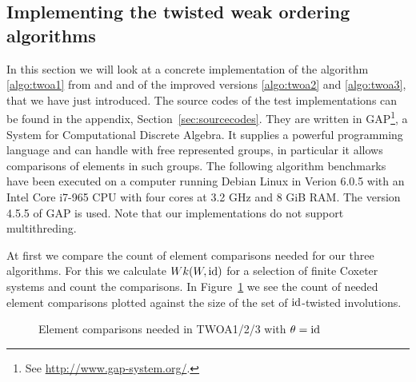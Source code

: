 \subsection{Implementing the twisted weak ordering algorithms}
\label{sec:implementing-twisted-involutions-algorithms}

In this section we will look at a concrete implementation of the algorithm \ref{algo:twoa1} from \cite{brennemann:twoa} and \cite{haas:twoa} and of the improved versions \ref{algo:twoa2} and \ref{algo:twoa3}, that we have just introduced. The source codes of the test implementations can be found in the appendix, Section~\ref{sec:sourcecodes}. They are written in GAP\footnote{See \url{http://www.gap-system.org/}.}, a System for Computational Discrete Algebra. It supplies a powerful programming language and can handle with free represented groups, in particular it allows comparisons of elements in such groups. The following algorithm benchmarks have been executed on a computer running Debian Linux in Verion 6.0.5 with an Intel\textsuperscript{\textregistered} Core\textsuperscript{\texttrademark} i7-965 CPU with four cores at 3.2 GHz and 8 GiB RAM. The version 4.5.5 of GAP is used. Note that our implementations do not support multithreding.

At first we compare the count of element comparisons needed for our three algorithms. For this we calculate $Wk(W,\operatorname{id})$ for a selection of finite Coxeter systems and count the comparisons. In Figure~\ref{fig:twoa123-element-comparisons} we see the count of needed element comparisons plotted against the size of the set of $\operatorname{id}$-twisted involutions.

\begin{figure}[ht]
	\centering
	\caption{Element comparisons needed in TWOA1/2/3 with $\theta = \operatorname{id}$}
	\label{fig:twoa123-element-comparisons}
\end{figure}

